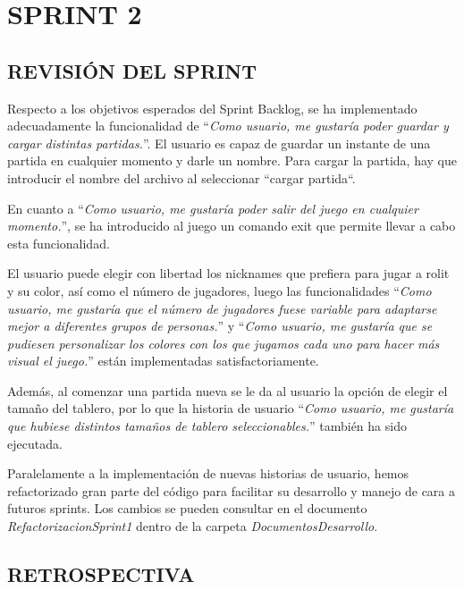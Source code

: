 \documentclass[../../SCRUM.tex]{subfiles}
\begin{document}
\section{SPRINT 2}
\subsection{REVISIÓN DEL SPRINT}
Respecto a los objetivos esperados del Sprint Backlog, se ha implementado adecuadamente la funcionalidad de ``\textit{Como usuario, me gustaría poder guardar y cargar distintas partidas.}''. El usuario es capaz de guardar un instante de una partida en cualquier momento y darle un nombre. Para cargar la partida, hay que introducir el nombre del archivo al seleccionar ``cargar partida``.

En cuanto a ``\textit{Como usuario, me gustaría poder salir del juego en cualquier momento.}'', se ha introducido al juego un comando exit que permite llevar a cabo esta funcionalidad.

El usuario puede elegir con libertad los nicknames que prefiera para jugar a rolit y su color, así como el número de jugadores, luego las funcionalidades ``\textit{Como usuario, me gustaría que el número de jugadores fuese variable para adaptarse mejor a diferentes grupos de personas.}'' y ``\textit{Como usuario, me gustaría que se pudiesen personalizar los colores con los que jugamos cada uno para hacer más visual el juego.}''  están implementadas satisfactoriamente.

Además, al comenzar una partida nueva se le da al usuario la opción de elegir el tamaño del tablero, por lo que la historia de usuario ``\textit{Como usuario, me gustaría que hubiese distintos tamaños de tablero seleccionables.}'' también ha sido ejecutada.

Paralelamente a la implementación de nuevas historias de usuario, hemos refactorizado gran parte del código para facilitar su desarrollo y manejo de cara a futuros sprints. Los cambios se pueden consultar en el documento \textit{RefactorizacionSprint1} dentro de la carpeta \textit{DocumentosDesarrollo}.



\subsection{RETROSPECTIVA}
\end{document}
